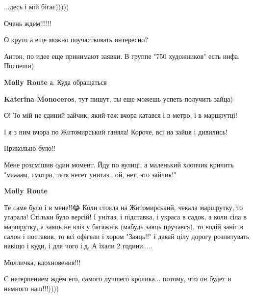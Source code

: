 
...десь і мій бігає)))))


Очень ждем!!!!!!


О круто а еще можно поучаствовать интересно?

\begin{itemize} %

Антон, по идее еще принимают заявки. В группе "750 художников" есть инфа. Поспеши)

\textbf{Molly Route} а. Куда обращаться

\textbf{Katerina Monoceros}, тут пишут, ты еще можешь успеть получить зайца)
\end{itemize} %


О! То мій не єдиний зайчик, який теж вчора катався і в метро, і в маршрутці!

І я з ним вчора по Житомирський ганяла! Короче, всі на зайця і дивились!

Прикольно було!!

\begin{itemize} %

Мене розсмiшив один момент. Йду по вулицi, а маленький хлопчик кричить "маааам,
смотри, тетя несет унитаз.. ой, нет, это зайчик!"

\textbf{Molly Route} 

Те саме було і в мене!!😂 Коли стояла на Житомирський, чекала маршрутку, то
угарала! Стільки було версій! І унітаз, і підставка, і украса в садок, а коли
сіла в маршрутку, а заяць не вліз у багажнік (мабудь заяць пручався), то
водій заніс в салон і поставив, то всі офігели і хором "Заяць!!" і давай цілу
дорогу розпитувать навіщо і куди, і для чого і.д. А їхали 2 години.....

\end{itemize} %


Молличка, вдохновения!!!

С нетерпением ждём его, самого лучшего кролика... потому, что он будет и
немного наш!!!))))

